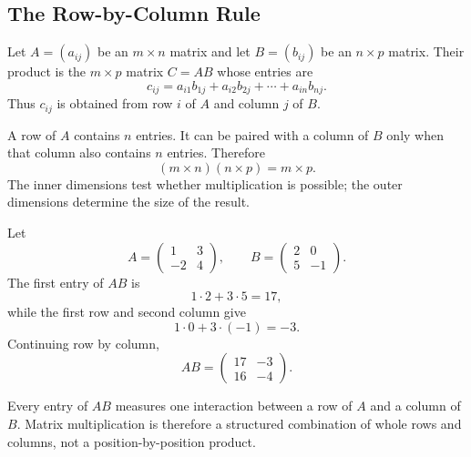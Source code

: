 \subsection{The Row-by-Column Rule}

\begin{definitionbox}
Let $A=(a_{ij})$ be an $m\times n$ matrix and let $B=(b_{ij})$ be an
$n\times p$ matrix. Their product is the $m\times p$ matrix $C=AB$ whose
entries are
\[
c_{ij}=a_{i1}b_{1j}+a_{i2}b_{2j}+\cdots+a_{in}b_{nj}.
\]
Thus $c_{ij}$ is obtained from row $i$ of $A$ and column $j$ of $B$.
\end{definitionbox}

\begin{interpretationbox}
A row of $A$ contains $n$ entries. It can be paired with a column of $B$ only
when that column also contains $n$ entries. Therefore
\[
(m\times n)(n\times p)=m\times p.
\]
The inner dimensions test whether multiplication is possible; the outer
dimensions determine the size of the result.
\end{interpretationbox}

\begin{examplebox}
Let
\[
A=\begin{pmatrix}1&3\\-2&4\end{pmatrix},
\qquad
B=\begin{pmatrix}2&0\\5&-1\end{pmatrix}.
\]
The first entry of $AB$ is
\[
1\cdot2+3\cdot5=17,
\]
while the first row and second column give
\[
1\cdot0+3\cdot(-1)=-3.
\]
Continuing row by column,
\[
AB=
\begin{pmatrix}
17&-3\\
16&-4
\end{pmatrix}.
\]
\end{examplebox}

\begin{summarybox}
Every entry of $AB$ measures one interaction between a row of $A$ and a column
of $B$. Matrix multiplication is therefore a structured combination of whole
rows and columns, not a position-by-position product.
\end{summarybox}
